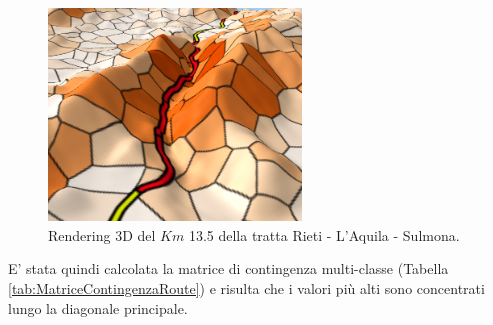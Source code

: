 \begin{figure}[H]
	\centering
	\includegraphics[width=0.6\textwidth]{images/rieti3d}
	\caption{Rendering 3D del $Km$ 13.5 della tratta Rieti - L'Aquila - Sulmona.}
	\label{km_13d}
\end{figure}


E' stata quindi calcolata la matrice di contingenza multi-classe (Tabella \ref{tab:MatriceContingenzaRoute}) e risulta che i valori più alti sono concentrati lungo la diagonale principale.

